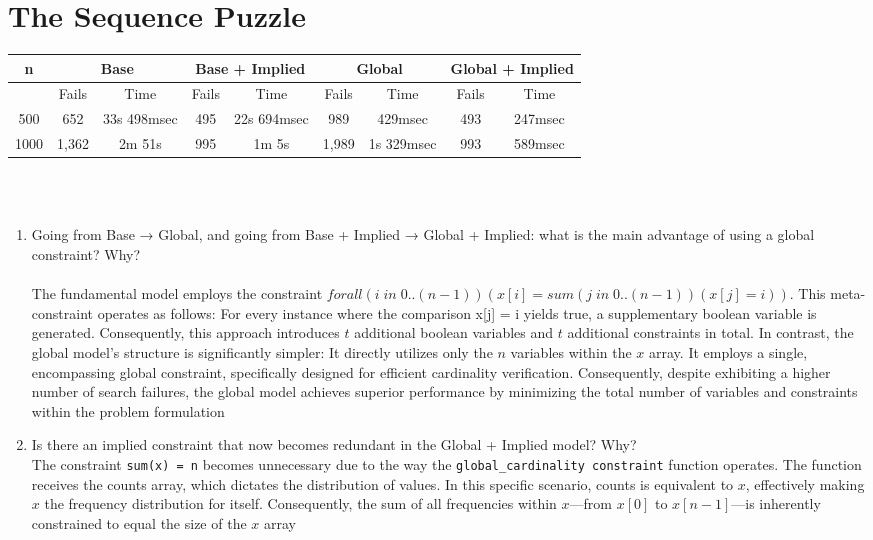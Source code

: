\documentclass{article}
\begin{document}
\section{The Sequence Puzzle}
\begin{tabular}{||c | c c | c c | c c | c c ||} 
 \hline
 n & \multicolumn{2}{c|}{Base} & \multicolumn{2}{c|}{Base + Implied} &  \multicolumn{2}{c|}{Global} &  \multicolumn{2}{c||}{Global + Implied} \\ 
 \hline\hline
   & Fails & Time & Fails & Time & Fails & Time & Fails & Time\\ 
 \hline
 500 & 652 & 33s 498msec & 495 & 22s 694msec & 989 & 429msec & 493 & 247msec \\
 \hline
 1000 & 1,362 & 2m 51s & 995 & 1m 5s & 1,989 & 1s 329msec & 993 & 589msec \\
 \hline

\end{tabular} \\ \\

\begin{enumerate}
    \item Going from Base → Global, and going from Base + Implied → Global + Implied: what is the main advantage of using a global constraint? Why? \\  \\

    The fundamental model employs the constraint $forall(i \; in \; 0..(n-1))(x[i] = sum(j \; in \; 0..(n-1))(x[j] = i))$. This meta-constraint operates as follows:
    For every instance where the comparison x[j] = i yields true, a supplementary boolean variable is generated. Consequently, this approach introduces $t$ additional boolean variables and $t$ additional constraints in total.
    In contrast, the global model's structure is significantly simpler:
    It directly utilizes only the $n$ variables within the $x$ array.
    It employs a single, encompassing global constraint, specifically designed for efficient cardinality verification.
    Consequently, despite exhibiting a higher number of search failures, the global model achieves superior performance by minimizing the total number of variables and constraints within the problem formulation
    
    \item Is there an implied constraint that now becomes redundant in
the Global + Implied model? Why? \\

    The constraint \texttt{sum(x) = n} becomes unnecessary due to the way the \texttt{global\_cardinality constraint} function operates. The function receives the counts array, which dictates the distribution of values. In this specific scenario, counts is equivalent to $x$, effectively making $x$ the frequency distribution for itself. Consequently, the sum of all frequencies within $x$—from $x[0]$ to $x[n-1]$—is inherently constrained to equal the size of the $x$ array

\end{enumerate}
\end{document}
